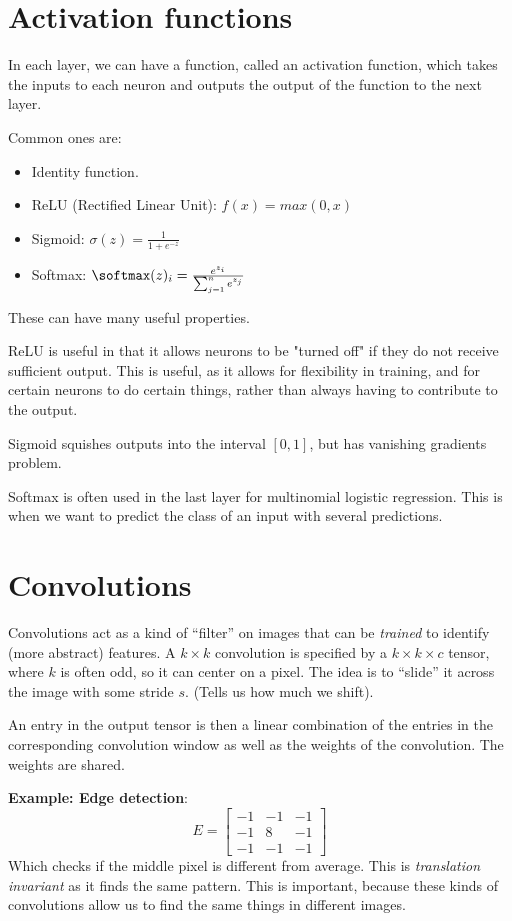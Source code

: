 \documentclass{article}
\begin{document}
\section{Activation functions}
  In each layer, we can have a function, called an activation function, which takes the inputs to each neuron and outputs the output of the function to the next layer.
  
  Common ones are:
  \begin{itemize}
    \item Identity function. 
    \item ReLU (Rectified Linear Unit): $f(x) = max(0, x)$ 
    \item Sigmoid: $\sigma(z) = \frac{1}{1+e^{-z}}$
    \item Softmax: $\softmax(z)_i = \frac{e^{z_i}}{\sum_{j=1}^{n}{e^{z_j}}}$
  \end{itemize}
  These can have many useful properties.
  
  ReLU is useful in that it allows neurons to be "turned off" if they do not receive sufficient output. This is useful, as it allows for flexibility in training, and for certain neurons to do certain things, rather than always having to contribute to the output. 
  
  Sigmoid squishes outputs into the interval $[0, 1]$, but has vanishing gradients problem.
  
  Softmax is often used in the last layer for multinomial logistic regression. This is when we want to predict the class of an input with several predictions.
  
  
\section{Convolutions}
  Convolutions act as a kind of ``filter'' on images that can be \emph{trained} to identify (more abstract) features. A $k \times k$ convolution is specified by a $k \times k \times c$ tensor, where $k$ is often odd, so it can center on a pixel. The idea is to ``slide'' it across the image with some stride $s$. (Tells us how much we shift). 
  
  An entry in the output tensor is then a linear combination of the entries in the corresponding convolution window as well as the weights of the convolution. The weights are shared. 

  \textbf{Example: Edge detection}: 
  \begin{equation}
    E = \begin{bmatrix}
      -1 & -1 & -1 \\
      -1 & 8 & -1 \\
      -1 & -1 & -1
    \end{bmatrix}
  \end{equation}
  Which checks if the middle pixel is different from average. This is \emph{translation invariant} as it finds the same pattern. This is important, because these kinds of convolutions allow us to find the same things in different images. 
\end{document}
